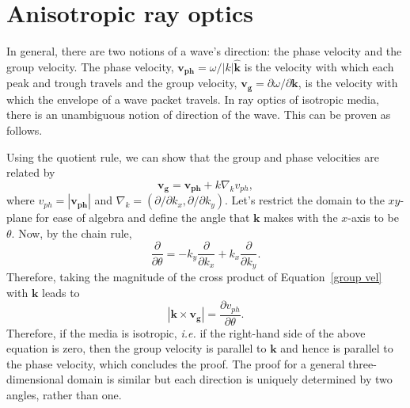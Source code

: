 	
	\section{Anisotropic ray optics}
	\label{sec: aniso ray}
		
	In general, there are two notions of a wave's direction: the phase velocity and the group velocity. The phase velocity, $\mathbf{v_{ph}} = \omega / |k| \mathbf{\hat{k}}$ is the velocity with which each peak and trough travels and the group velocity, $\mathbf{v_g} = \partial \omega / \partial \mathbf{k}$, is the velocity with which the envelope of a wave packet travels. In ray optics of isotropic media, there is an unambiguous notion of direction of the wave. This can be proven as follows.
	
	Using the quotient rule, we can show that the group and phase velocities are related by
	\begin{equation}
	\mathbf{v_g} = \mathbf{v_{ph}} + k\nabla_k v_{ph}, \label{group vel}
	\end{equation}
	where $v_{ph} = |\mathbf{v_{ph}}|$ and $\nabla_k = (\partial/\partial k_x, \partial/\partial k_y)$. Let's restrict the domain to the $xy$-plane for ease of algebra and define the angle that $\mathbf{k}$ makes with the $x$-axis to be $\theta$. Now, by the chain rule,
	\begin{equation}
	\frac{\partial}{\partial \theta} = -k_y \frac{\partial}{\partial k_x} + k_x \frac{\partial}{\partial k_y}.
	\end{equation}
	Therefore, taking the magnitude of the cross product of Equation~\eqref{group vel} with $\mathbf{k}$ leads to
	\begin{equation}
	|\mathbf{k} \times \mathbf{v_g}| = \frac{\partial v_{ph}}{\partial \theta}.
	\end{equation}
	Therefore, if the media is isotropic, \textit{i.e.} if the right-hand side of the above equation is zero, then the group velocity is parallel to $\mathbf{k}$ and hence is parallel to the phase velocity, which concludes the proof. The proof for a general three-dimensional domain is similar but each direction is uniquely determined by two angles, rather than one.
	
